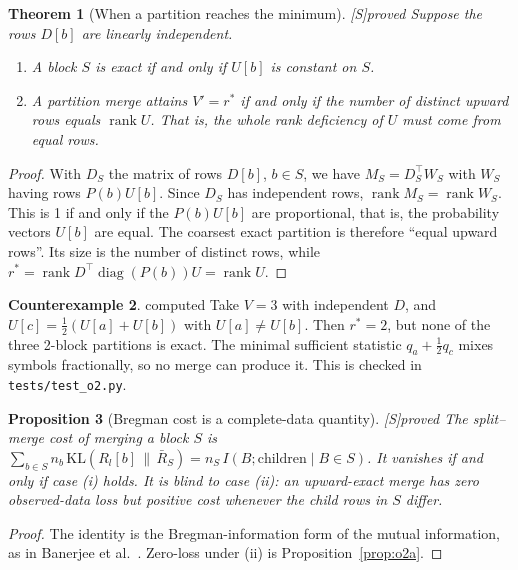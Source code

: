 \documentclass[11pt]{article}
\newtheorem{theorem}{Theorem}[section]
\newtheorem{proposition}[theorem]{Proposition}
\theoremstyle{definition}
\newtheorem{counterexample}[theorem]{Counterexample}
\theoremstyle{remark}
\newcommand{\src}[1]{\textsf{\small[#1]}}
\newcommand{\st}[1]{\textsf{\small\color{gray}#1}}
\begin{document}
\begin{theorem}[When a partition reaches the minimum]\label{thm:o2c}\src{S}\st{proved}
Suppose the rows $D[b]$ are linearly independent.
\begin{enumerate}
  \item A block $S$ is exact if and only if $U[b]$ is constant on $S$.
  \item A partition merge attains $V'=r^*$ if and only if the number of distinct upward rows equals $\operatorname{rank}U$. That is, the whole rank deficiency of $U$ must come from equal rows.
\end{enumerate}
\end{theorem}
\begin{proof}
With $D_S$ the matrix of rows $D[b]$, $b\in S$, we have $M_S=D_S^{\top}W_S$ with $W_S$ having rows $P(b)U[b]$. Since $D_S$ has independent rows, $\operatorname{rank}M_S=\operatorname{rank}W_S$. This is 1 if and only if the $P(b)U[b]$ are proportional, that is, the probability vectors $U[b]$ are equal. The coarsest exact partition is therefore ``equal upward rows''. Its size is the number of distinct rows, while $r^*=\operatorname{rank}D^{\top}\operatorname{diag}(P(b))U=\operatorname{rank}U$.
\end{proof}

\begin{counterexample}\label{ce:o2}\st{computed}
Take $V=3$ with independent $D$, and $U[c]=\tfrac12(U[a]+U[b])$ with $U[a]\neq U[b]$. Then $r^*=2$, but none of the three 2-block partitions is exact. The minimal sufficient statistic $q_a+\tfrac12 q_c$ mixes symbols fractionally, so no merge can produce it. This is checked in \texttt{tests/test\_o2.py}.
\end{counterexample}

\begin{proposition}[Bregman cost is a complete-data quantity]\label{prop:o2d}\src{S}\st{proved}
The split--merge cost of merging a block $S$ is $\sum_{b\in S}n_b\,\mathrm{KL}(R_l[b]\,\|\,\bar R_S)=n_S\,I(B;\text{children}\mid B\in S)$. It vanishes if and only if case (i) holds. It is blind to case (ii): an upward-exact merge has zero observed-data loss but positive cost whenever the child rows in $S$ differ.
\end{proposition}
\begin{proof}
The identity is the Bregman-information form of the mutual information, as in Banerjee et al.\ \cite{banerjee}. Zero-loss under (ii) is Proposition~\ref{prop:o2a}.
\end{proof}
\end{document}
